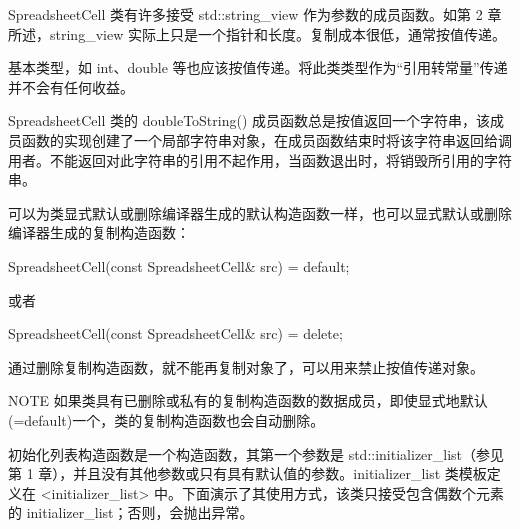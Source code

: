 SpreadsheetCell 类有许多接受 std::string\_view 作为参数的成员函数。如第 2 章所述，string\_view 实际上只是一个指针和长度。复制成本很低，通常按值传递。

基本类型，如 int、double 等也应该按值传递。将此类类型作为“引用转常量”传递并不会有任何收益。

SpreadsheetCell 类的 doubleToString() 成员函数总是按值返回一个字符串，该成员函数的实现创建了一个局部字符串对象，在成员函数结束时将该字符串返回给调用者。不能返回对此字符串的引用不起作用，当函数退出时，将销毁所引用的字符串。


可以为类显式默认或删除编译器生成的默认构造函数一样，也可以显式默认或删除编译器生成的复制构造函数：

\begin{cpp}
SpreadsheetCell(const SpreadsheetCell& src) = default;
\end{cpp}

或者

\begin{cpp}
SpreadsheetCell(const SpreadsheetCell& src) = delete;
\end{cpp}

通过删除复制构造函数，就不能再复制对象了，可以用来禁止按值传递对象。

\begin{myNotic}{NOTE}
如果类具有已删除或私有的复制构造函数的数据成员，即使显式地默认(=default)一个，类的复制构造函数也会自动删除。
\end{myNotic}


初始化列表构造函数是一个构造函数，其第一个参数是 std::initializer\_list（参见第 1 章），并且没有其他参数或只有具有默认值的参数。initializer\_list 类模板定义在 <initializer\_list> 中。下面演示了其使用方式，该类只接受包含偶数个元素的 initializer\_list；否则，会抛出异常。


